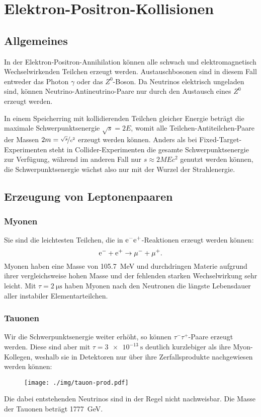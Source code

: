 \chapter{Elektron-Positron-Kollisionen}
\section{Allgemeines}
In der Elektron-Positron-Annihilation können alle schwach und elektromagnetisch Wechselwirkenden Teilchen erzeugt werden.
Austauschbosonen sind in diesem Fall entweder das Photon $\gamma$ oder das $Z^0$-Boson.
Da Neutrinos elektrisch ungeladen sind, können Neutrino-Antineutrino-Paare nur durch den Austausch eines $Z^0$ erzeugt werden.

In einem Speicherring mit kollidierenden Teilchen gleicher Energie beträgt die maximale Schwerpunktsenergie $\sqrt{s}=2E$, womit alle Teilchen-Antiteilchen-Paare der Massen $2m = \nicefrac{\sqrt{s}}{c^2}$ erzeugt werden können.
Anders als bei Fixed-Target-Experimenten steht in Collider-Experimenten die gesamte Schwerpunktsenergie zur Verfügung, während im anderen Fall nur $s\approx 2MEc^2$ genutzt werden können, die Schwerpunktsenergie wächst also nur mit der Wurzel der Strahlenergie.

\section{Erzeugung von Leptonenpaaren}
\subsection{Myonen}
Sie sind die leichtesten Teilchen, die in $\text{e}^-\text{e}^+$-Reaktionen erzeugt werden können:
\begin{equation*}
	\text{e}^- + \text{e}^+ \rightarrow \mu^- + \mu^+.
\end{equation*}
Myonen haben eine Masse von \SI{105.7}{\MeV} und durchdringen Materie aufgrund ihrer vergleichsweise hohen Masse und der fehlenden starken Wechselwirkung sehr leicht.
Mit $\tau=\SI{2}{\micro\second}$ haben Myonen nach den Neutronen die längste Lebensdauer aller instabiler Elementarteilchen.
\newpage
\subsection{Tauonen}
Wir die Schwerpunktsenergie weiter erhöht, so können $\tau^-\tau^+$-Paare erzeugt werden.
Diese sind aber mit $\tau=\SI{3e-13}{\second}$ deutlich kurzlebiger als ihre Myon-Kollegen, weshalb sie in Detektoren nur über ihre Zerfallsprodukte nachgewiesen werden können:
\begin{figure}[h!]
	\centering
	\texttt{[image: ./img/tauon-prod.pdf]}
\end{figure}
Die dabei entstehenden Neutrinos sind in der Regel nicht nachweisbar.
Die Masse der Tauonen beträgt \SI{1777}{\GeV}.

